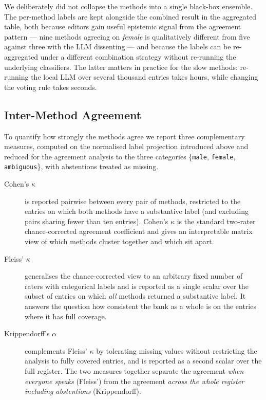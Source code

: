 \documentclass{eceasst}
\begin{document}



We deliberately did not collapse the methods into a single black-box ensemble. The per-method labels are kept alongside the combined result in the aggregated table, both because editors gain useful epistemic signal from the agreement pattern --- nine methods agreeing on \emph{female} is qualitatively different from five against three with the LLM dissenting --- and because the labels can be re-aggregated under a different combination strategy without re-running the underlying classifiers. The latter matters in practice for the slow methods: re-running the local LLM over several thousand entries takes hours, while changing the voting rule takes seconds.

\subsection{Inter-Method Agreement}
\label{sec:agreement}

To quantify how strongly the methods agree we report three complementary measures, computed on the normalised label projection introduced above and reduced for the agreement analysis to the three categories \{\texttt{male}, \texttt{female}, \texttt{ambiguous}\}, with abstentions treated as missing.

\begin{description}
  \item[Cohen's $\kappa$] is reported pairwise between every pair of methods, restricted to the entries on which both methods have a substantive label (and excluding pairs sharing fewer than ten entries). Cohen's $\kappa$ is the standard two-rater chance-corrected agreement coefficient and gives an interpretable matrix view of which methods cluster together and which sit apart.
  \item[Fleiss' $\kappa$] generalises the chance-corrected view to an arbitrary fixed number of raters with categorical labels and is reported as a single scalar over the subset of entries on which \emph{all} methods returned a substantive label. It answers the question how consistent the bank as a whole is on the entries where it has full coverage.
  \item[Krippendorff's $\alpha$] complements Fleiss' $\kappa$ by tolerating missing values without restricting the analysis to fully covered entries, and is reported as a second scalar over the full register. The two measures together separate the agreement \emph{when everyone speaks} (Fleiss') from the agreement \emph{across the whole register including abstentions} (Krippendorff).
\end{description}
\end{document}
